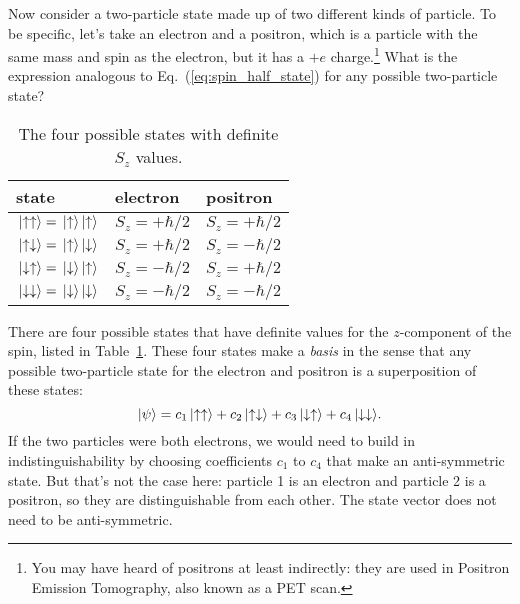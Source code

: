 Now consider a two-particle state made up of two different kinds of
particle.  To be specific, let's take an electron and a positron,
which is a particle with the same mass and spin as the electron, but
it has a $+e$ charge.\footnote{You may have heard of positrons at
  least indirectly: they are used in Positron Emission Tomography,
  also known as a PET scan.}  
What is the expression analogous to Eq.~(\ref{eq:spin_half_state})
for any possible two-particle state?

\begin{table}[t]
\renewcommand{\arraystretch}{1.2}
\begin{center}
\begin{tabular}{lll}
\hline\hline 
state  & electron  & positron \\
\hline
$\,|\mbox{$\uparrow\uparrow$}\rangle = 
 \,|\mbox{$\uparrow$}\rangle  \,|\mbox{$\uparrow$}\rangle$ \quad & 
 $S_z=+\hbar/2$ \quad & $S_z=+\hbar/2$ \\
$\,|\mbox{$\uparrow\downarrow$}\rangle =
 \,|\mbox{$\uparrow$}\rangle \,|\mbox{$\downarrow$}\rangle$ &
  $S_z=+\hbar/2$ & $S_z=-\hbar/2$ \\
$\,|\mbox{$\downarrow\uparrow$}\rangle =
 \,|\mbox{$\downarrow$}\rangle \,|\mbox{$\uparrow$}\rangle$ & 
 $S_z=-\hbar/2$ & $S_z=+\hbar/2$ \\
$\,|\mbox{$\downarrow\downarrow$}\rangle =
 \,|\mbox{$\downarrow$}\rangle \,|\mbox{$\downarrow$}\rangle$ &
  $S_z=-\hbar/2$ & $S_z=-\hbar/2$\\
\hline\hline
\end{tabular}
\caption{The four possible states with definite $S_z$ values.}
\label{table:two_particle_basis}
\end{center}
\end{table}

There are four possible states that have definite values for the
$z$-component of the spin, listed in
Table~\ref{table:two_particle_basis}.  These four states make a
\textit{basis} in the sense that any possible two-particle state for
the electron and positron is a superposition of these states:
\begin{equation}
|\psi\rangle = c_1 \,|\mbox{$\uparrow\uparrow$}\rangle +
 c_2 \,|\mbox{$\uparrow\downarrow$}\rangle +
 c_3 \,|\mbox{$\downarrow\uparrow$}\rangle +
 c_4 \,|\mbox{$\downarrow\downarrow$}\rangle  .
\label{eq:general_two_particle_state}
\end{equation}
If the two particles were both electrons, we would need to 
build in indistinguishability by choosing coefficients $c_1$ to $c_4$
that make an anti-symmetric state.  But that's not the case here:
particle 1 is an electron and particle 2 is a positron, so they
are distinguishable from each other.  The state vector does not need
to be anti-symmetric.

